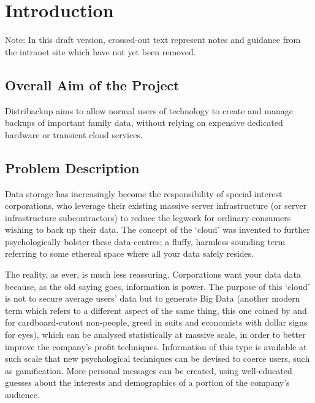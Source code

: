 \documentclass[12pt,a4paper,]{adreport}
\author{}
\date{}
\begin{document}
{
\hypersetup{linkcolor=black}
\setcounter{tocdepth}{2}
\tableofcontents
}
\chapter{Introduction}\label{introduction}

Note: In this draft version, crossed-out text represent notes and
guidance from the intranet site which have not yet been removed.

\section{Overall Aim of the Project}\label{overall-aim-of-the-project}

Distribackup aims to allow normal users of technology to create and
manage backups of important family data, without relying on expensive
dedicated hardware or transient cloud services.

\section{Problem Description}\label{problem-description}

Data storage has increasingly become the responsibility of
special-interest corporations, who leverage their existing massive
server infrastructure (or server infrastructure subcontractors) to
reduce the legwork for ordinary consumers wishing to back up their data.
The concept of the `cloud' was invented to further psychologically
bolster these data-centres; a fluffy, harmless-sounding term referring
to some ethereal space where all your data safely resides.

The reality, as ever, is much less reassuring. Corporations want your
data data because, as the old saying goes, information is power. The
purpose of this `cloud' is not to secure average users' data but to
generate Big Data (another modern term which refers to a different
aspect of the same thing, this one coined by and for cardboard-cutout
non-people, greed in suits and economists with dollar signs for eyes),
which can be analysed statistically at massive scale, in order to better
improve the company's profit techniques. Information of this type is
available at such scale that new psychological techniques can be devised
to coerce users, such as gamification. More personal messages can be
created, using well-educated guesses about the interests and
demographics of a portion of the company's audience.
\end{document}
